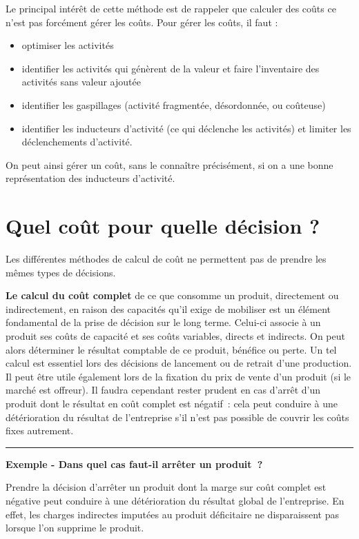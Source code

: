 \documentclass[oneside]{kaobook}
\begin{document}
Le principal intérêt de cette méthode est de rappeler que calculer des coûts ce n’est pas forcément gérer les coûts. Pour gérer les coûts, il faut :
\begin{itemize}
\item optimiser les activités
\item identifier les activités qui génèrent de la valeur et faire l’inventaire des activités sans valeur ajoutée
\item identifier les gaspillages (activité fragmentée, désordonnée, ou coûteuse)
\item identifier les inducteurs d’activité (ce qui déclenche les activités) et limiter les déclenchements d’activité.
\end{itemize}

On peut ainsi gérer un coût, sans le connaître précisément, si on a une bonne représentation des inducteurs d'activité.

\section{Quel coût pour quelle décision ?}
\label{sec:org091eee8}
Les différentes méthodes de calcul de coût ne permettent pas de prendre les mêmes types de décisions.

\textbf{Le calcul du coût complet} de ce que consomme un produit, directement ou indirectement, en raison des capacités qu'il exige de mobiliser est un élément fondamental de la prise de décision sur le long terme. Celui-ci associe à un produit ses coûts de capacité et ses coûts variables, directs et indirects. On peut alors déterminer le résultat comptable de ce produit, bénéfice ou perte. Un tel calcul est essentiel lors des décisions de lancement ou de retrait d'une production. Il peut être utile également lors de la fixation du prix de vente d'un produit (si le marché est offreur). Il faudra cependant rester prudent en cas d'arrêt d'un produit dont le résultat en coût complet est négatif : cela peut conduire à une détérioration du résultat de l'entreprise s'il n'est pas possible de couvrir les coûts fixes autrement.

\noindent\rule{\textwidth}{0.5pt}
\textbf{Exemple - Dans quel cas faut-il arrêter un produit ?}

Prendre la décision d'arrêter un produit dont la marge sur coût complet est négative peut conduire à une détérioration du résultat global de l'entreprise. En effet, les charges indirectes imputées au produit déficitaire ne disparaissent pas lorsque l'on supprime le produit.
\end{document}
